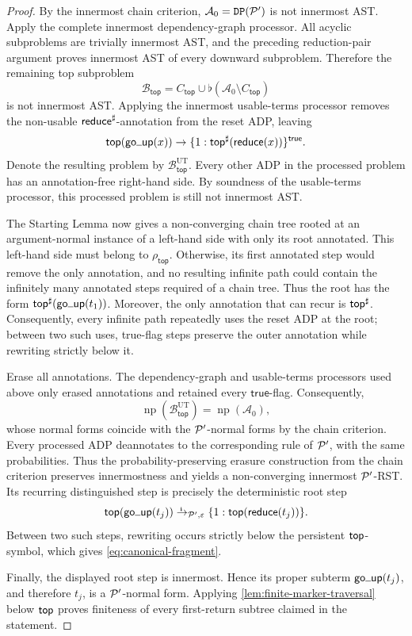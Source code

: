 \begin{proof}
  By the innermost chain criterion,
  \(\mathcal A_0=\DP{\P'}\) is not innermost AST.  Apply the complete
  innermost dependency-graph processor.  All acyclic subproblems are trivially
  innermost AST, and the preceding reduction-pair argument proves innermost AST
  of every downward subproblem.  Therefore the remaining top subproblem
  \[
    \mathcal B_{\mathsf{top}}
      =C_{\mathsf{top}}
        \cup\flat(\mathcal A_0\setminus C_{\mathsf{top}})
  \]
  is not innermost AST.  Applying the innermost usable-terms processor removes
  the non-usable \(\treduce^{\sharp}\)-annotation from the reset ADP, leaving
  \[
    \ttop(\tgoup(x))
      \to\{1:\ttop^{\sharp}(\treduce(x))\}^{\mathsf{true}}.
  \]
  Denote the resulting problem by
  \(\mathcal B_{\mathsf{top}}^{\mathrm{UT}}\).
  Every other ADP in the processed problem has an annotation-free right-hand
  side.  By soundness of the usable-terms processor, this processed problem is
  still not innermost AST.

  The Starting Lemma now gives a non-converging chain tree rooted at an
  argument-normal instance of a left-hand side with only its root annotated.
  This left-hand side must belong to \(\rho_{\mathsf{top}}\).  Otherwise, its
  first annotated step would remove the only annotation, and no resulting
  infinite path could contain the infinitely many annotated steps required of
  a chain tree.  Thus the root has the form
  \(\ttop^{\sharp}(\tgoup(t_1))\).  Moreover, the only annotation that can
  recur is \(\ttop^{\sharp}\).  Consequently, every infinite path repeatedly
  uses the reset ADP at the root; between two such uses, true-flag steps preserve
  the outer annotation while rewriting strictly below it.

  Erase all annotations.  The dependency-graph and usable-terms processors used
  above only erased annotations and retained every \(\mathsf{true}\)-flag.
  Consequently,
  \[
    \operatorname{np}(\mathcal B_{\mathsf{top}}^{\mathrm{UT}})
      =\operatorname{np}(\mathcal A_0),
  \]
  whose normal forms coincide with the \(\P'\)-normal forms by the chain
  criterion.  Every processed ADP deannotates to the corresponding rule of
  \(\P'\), with the same probabilities.
  Thus the probability-preserving
  erasure construction from the chain criterion preserves innermostness and
  yields a non-converging innermost \(\P'\)-RST.  Its recurring distinguished
  step is precisely the deterministic root step
  \[
    \ttop(\tgoup(t_j))
      \ito_{\P',\varepsilon}
      \{1:\ttop(\treduce(t_j))\}.
  \]
  Between two such steps, rewriting occurs strictly below the persistent
  \(\ttop\)-symbol, which gives \eqref{eq:canonical-fragment}.

  Finally, the displayed root step is innermost.  Hence its proper subterm
  \(\tgoup(t_j)\), and therefore \(t_j\), is a \(\P'\)-normal form.  Applying
  \cref{lem:finite-marker-traversal} below \(\ttop\) proves finiteness of every
  first-return subtree claimed in the statement.
\end{proof}

